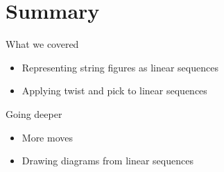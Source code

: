\section*{Summary}

\begin{frame}{\secname}
What we covered
\begin{itemize}
    \item Representing string figures as linear sequences
    \item Applying twist and pick to linear sequences
\end{itemize}

Going deeper

\begin{itemize}
    \item More moves 
    \item Drawing diagrams from linear sequences
\end{itemize}
\end{frame}

